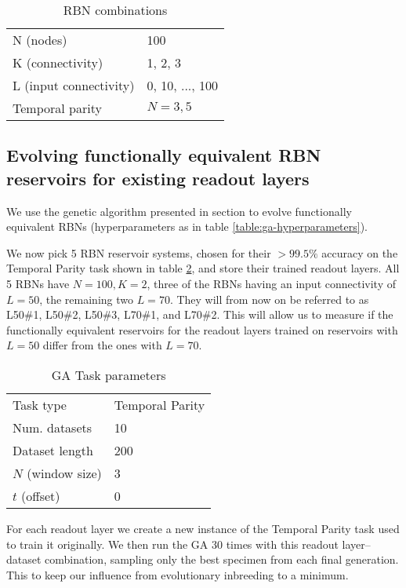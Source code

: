 \begin{table}
  \centering
  \caption{RBN combinations}
  \label{table:rbn-combinations}
  \begin{tabular}{ll}
    N (nodes)              & 100             \\
    K (connectivity)       & 1, 2, 3         \\
    L (input connectivity) & 0, 10, ..., 100 \\
    Temporal parity        & $N=3,5$ \\
  \end{tabular}
\end{table}

\subsection{Evolving functionally equivalent RBN reservoirs for existing readout layers}
\label{section:experiments:evolving}

We use the genetic algorithm presented in section \label{section:method:evolving-rbns} to evolve functionally equivalent RBNs (hyperparameters as in table \ref{table:ga-hyperparameters}).

We now pick 5 RBN reservoir systems,
chosen for their $> 99.5\%$ accuracy on the Temporal Parity task shown in table
\ref{table:ga-task-parameters},
and store their trained readout layers.
All 5 RBNs have $N=100, K=2$, three of the RBNs having an input connectivity of $L=50$,
the remaining two $L=70$.
They will from now on be referred to as L50\#1, L50\#2, L50\#3, L70\#1, and L70\#2.
This will allow us to measure if the functionally equivalent reservoirs for the readout layers trained on reservoirs with $L=50$ differ from the ones with $L=70$.

\begin{table}
  \centering
  \caption{GA Task parameters}
  \label{table:ga-task-parameters}
  \begin{tabular}{ll}
    Task type         & Temporal Parity \\
    Num. datasets     & 10               \\
    Dataset length    & 200             \\
    $N$ (window size) & 3               \\
    $t$ (offset)      & 0               \\
  \end{tabular}
\end{table}

For each readout layer we create a new instance of the Temporal Parity task used to train it originally.
We then run the GA 30 times with this readout layer–dataset combination,
sampling only the best specimen from each final generation.
This to keep our influence from evolutionary inbreeding to a minimum.
